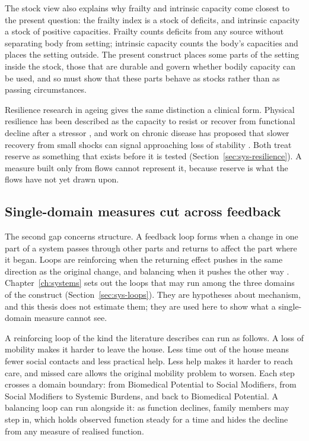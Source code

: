 The stock view also explains why frailty and intrinsic capacity come closest to the present question: the frailty index is a stock of deficits, and intrinsic capacity a stock of positive capacities. Frailty counts deficits from any source without separating body from setting; intrinsic capacity counts the body's capacities and places the setting outside. The present construct places some parts of the setting inside the stock, those that are durable and govern whether bodily capacity can be used, and so must show that these parts behave as stocks rather than as passing circumstances.

Resilience research in ageing gives the same distinction a clinical form. Physical resilience has been described as the capacity to resist or recover from functional decline after a stressor \citep{whitson_2016}, and work on chronic disease has proposed that slower recovery from small shocks can signal approaching loss of stability \citep{olde_rikkert_2016,scheffer_2009}. Both treat reserve as something that exists before it is tested (Section~\ref{sec:sys-resilience}). A measure built only from flows cannot represent it, because reserve is what the flows have not yet drawn upon.

\subsection{Single-domain measures cut across feedback}

The second gap concerns structure. A feedback loop forms when a change in one part of a system passes through other parts and returns to affect the part where it began. Loops are reinforcing when the returning effect pushes in the same direction as the original change, and balancing when it pushes the other way \citep{sterman_2000,meadows_2008}. Chapter~\ref{ch:systems} sets out the loops that may run among the three domains of the construct (Section~\ref{sec:sys-loops}). They are hypotheses about mechanism, and this thesis does not estimate them; they are used here to show what a single-domain measure cannot see.

A reinforcing loop of the kind the literature describes can run as follows. A loss of mobility makes it harder to leave the house. Less time out of the house means fewer social contacts and less practical help. Less help makes it harder to reach care, and missed care allows the original mobility problem to worsen. Each step crosses a domain boundary: from Biomedical Potential to Social Modifiers, from Social Modifiers to Systemic Burdens, and back to Biomedical Potential. A balancing loop can run alongside it: as function declines, family members may step in, which holds observed function steady for a time and hides the decline from any measure of realised function.

